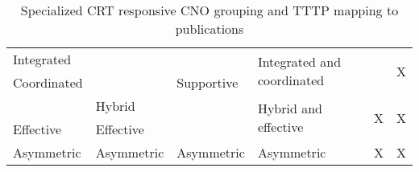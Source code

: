 \begin{table}[!htb]
{\begin{tabular}{|l|p{1.5cm}|l|p{2cm}|c|c|c|}
Integrated   &                          &              & \multirow{2}{2.2cm}{Integrated and coordinated} & \multirow{2}{*}{}  & \multirow{2}{*}{}       & \multirow{2}{*}{X}       \\ \cline{1-3}
Coordinated  &                          & Supportive   &                                             &                        &                         &                          \\ \hline
             & Hybrid                   &              & \multirow{2}{2.2cm}{Hybrid and effective}   & \multirow{2}{*}{}      & \multirow{2}{*}{X}      & \multirow{2}{*}{X}       \\ \cline{1-3}
Effective    & Effective                &              &                                             &                        &                         &                          \\ \hline
Asymmetric   & Asymmetric               & Asymmetric   & Asymmetric                                  &                        & X                       & X                        \\ \hline
\end{tabular}%
}
\caption{Specialized CRT responsive CNO grouping and TTTP mapping to publications}
\label{tab:scrt}
\end{table}

